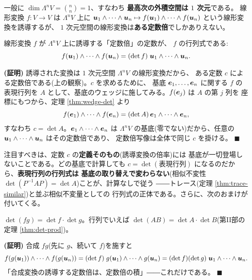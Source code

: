 一般に $\dim \Lambda^n V = \binom{n}{n} = 1$、すなわち
\textbf{最高次の外積空間は $1$ 次元}である。
線形変換 $f : V \to V$ は $\Lambda^n V$ 上に
$\bm{u}_1 \wedge \cdots \wedge \bm{u}_n \mapsto
f(\bm{u}_1) \wedge \cdots \wedge f(\bm{u}_n)$ という線形変換を誘導するが、
$1$ 次元空間の線形変換は\textbf{ある定数倍}でしかありえない。

\begin{teiri}[行列式の基底によらない定義]\label{thm:wedge-detdef}
線形変換 $f$ が $\Lambda^n V$ 上に誘導する「定数倍」の定数が、
$f$ の行列式である:
\[
f(\bm{u}_1) \wedge \cdots \wedge f(\bm{u}_n)
= (\det f)\; \bm{u}_1 \wedge \cdots \wedge \bm{u}_n.
\]
\end{teiri}

\noindent\textbf{(証明)}\quad
誘導された変換は $1$ 次元空間 $\Lambda^n V$ の線形変換だから、
ある定数 $c$ による定数倍である(上の観察)。$c$ を求めるために、
基底 $\bm{e}_1, \dots, \bm{e}_n$ に関する $f$ の表現行列を $A$
として、基底のウェッジに施してみる。$f(\bm{e}_j)$ は $A$ の第 $j$ 列を
座標にもつから、定理 \ref{thm:wedge-det} より
\[
f(\bm{e}_1) \wedge \cdots \wedge f(\bm{e}_n)
= (\det A)\,\bm{e}_1 \wedge \cdots \wedge \bm{e}_n,
\]
すなわち $c = \det A$。$\bm{e}_1 \wedge \cdots \wedge \bm{e}_n$ は
$\Lambda^n V$ の基底(零でない)だから、任意の
$\bm{u}_1 \wedge \cdots \wedge \bm{u}_n$ はその定数倍であり、
定数倍写像は全体で同じ $c$ を掛ける。 $\blacksquare$

注目すべきは、定数 $c$ の\textbf{定義そのもの}(誘導変換の倍率)には
基底が一切登場しないことである。どの基底で計算しても
$c = \det(\text{表現行列})$ になるのだから、\textbf{表現行列の行列式は
基底の取り替えで変わらない}(相似不変性
$\det(P^{-1}AP) = \det A$)ことが、計算なしで従う
――トレース(定理 \ref{thm:trace-similar})と並ぶ相似不変量としての
行列式の正体である。さらに、次のおまけが付いてくる。

\begin{teiri}[積の行列式・再訪]\label{thm:wedge-detprod}
$\det(fg) = \det f \cdot \det g$。行列でいえば
$\det(AB) = \det A \cdot \det B$(第II部の定理 \ref{thm:det-prod})。
\end{teiri}

\noindent\textbf{(証明)}\quad
合成 $fg$(先に $g$、続いて $f$)を施すと
\[
f(g(\bm{u}_1)) \wedge \cdots \wedge f(g(\bm{u}_n))
= (\det f)\; g(\bm{u}_1) \wedge \cdots \wedge g(\bm{u}_n)
= (\det f)(\det g)\; \bm{u}_1 \wedge \cdots \wedge \bm{u}_n.
\]
「合成変換の誘導する定数倍は、定数倍の積」――これだけである。
$\blacksquare$


